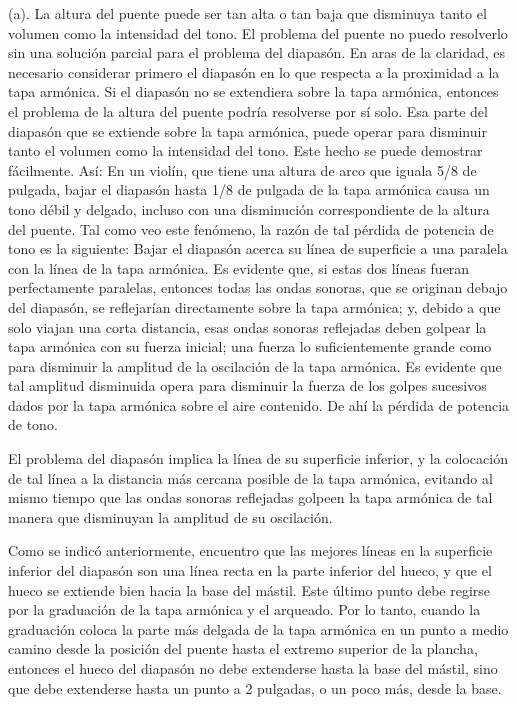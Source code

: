 \documentclass[12pt]{book}
\begin{document}
(a). La altura del puente puede ser tan alta o tan baja que disminuya tanto el volumen como la intensidad del tono. El problema del puente no puedo resolverlo sin una solución parcial para el problema del diapasón. En aras de la claridad, es necesario considerar primero el diapasón en lo que respecta a la proximidad a la tapa armónica. Si el diapasón no se extendiera sobre la tapa armónica, entonces el problema de la altura del puente podría resolverse por sí solo. Esa parte del diapasón que se extiende sobre la tapa armónica, puede operar para disminuir tanto el volumen como la intensidad del tono. Este hecho se puede demostrar fácilmente. Así: En un violín, que tiene una altura de arco que iguala 5/8 de pulgada, bajar el diapasón hasta 1/8 de pulgada de la tapa armónica causa un tono débil y delgado, incluso con una disminución correspondiente de la altura del puente. Tal como veo este fenómeno, la razón de tal pérdida de potencia de tono es la siguiente: Bajar el diapasón acerca su línea de superficie a una paralela con la línea de la tapa armónica. Es evidente que, si estas dos líneas fueran perfectamente paralelas, entonces todas las ondas sonoras, que se originan debajo del diapasón, se reflejarían directamente sobre la tapa armónica; y, debido a que solo viajan una corta distancia, esas ondas sonoras reflejadas deben golpear la tapa armónica con su fuerza inicial; una fuerza lo suficientemente grande como para disminuir la amplitud de la oscilación de la tapa armónica. Es evidente que tal amplitud disminuida opera para disminuir la fuerza de los golpes sucesivos dados por la tapa armónica sobre el aire contenido. De ahí la pérdida de potencia de tono.

El problema del diapasón implica la línea de su superficie inferior, y la colocación de tal línea a la distancia más cercana posible de la tapa armónica, evitando al mismo tiempo que las ondas sonoras reflejadas golpeen la tapa armónica de tal manera que disminuyan la amplitud de su oscilación.

Como se indicó anteriormente, encuentro que las mejores líneas en la superficie inferior del diapasón son una línea recta en la parte inferior del hueco, y que el hueco se extiende bien hacia la base del mástil. Este último punto debe regirse por la graduación de la tapa armónica y el arqueado. Por lo tanto, cuando la graduación coloca la parte más delgada de la tapa armónica en un punto a medio camino desde la posición del puente hasta el extremo superior de la plancha, entonces el hueco del diapasón no debe extenderse hasta la base del mástil, sino que debe extenderse hasta un punto a 2 pulgadas, o un poco más, desde la base.
\end{document}
